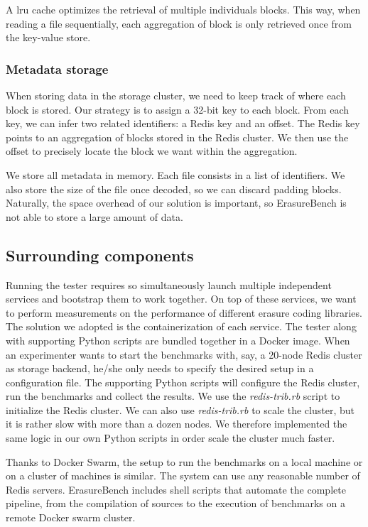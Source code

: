 A \ac{lru} cache optimizes the retrieval of multiple individuals blocks.
This way, when reading a file sequentially, each aggregation of block is only retrieved once from the key-value store.

\subsubsection{Metadata storage}

When storing data in the storage cluster, we need to keep track of where each block is stored. Our strategy is to assign a 32-bit key to each block. From each key, we can infer two related identifiers: a Redis key and an offset. The Redis key points to an aggregation of blocks stored in the Redis cluster. We then use the offset to precisely locate the block we want within the aggregation.

We store all metadata in memory. Each file consists in a list of identifiers. We also store the size of the file once decoded, so we can discard padding blocks. Naturally, the space overhead of our solution is important, so ErasureBench is not able to store a large amount of data.

\subsection{Surrounding components}

Running the tester requires so simultaneously launch multiple independent services and bootstrap them to work together. On top of these services, we want to perform measurements on the performance of different erasure coding libraries. The solution we adopted is the containerization of each service. The tester along with supporting Python scripts are bundled together in a Docker image.
When an experimenter wants to start the benchmarks with, say, a 20-node Redis cluster as storage backend, he/she only needs to specify the desired setup in a configuration file.
The supporting Python scripts will configure the Redis cluster, run the benchmarks and collect the results. We use the \textit{redis-trib.rb} script to initialize the Redis cluster.
We can also use \textit{redis-trib.rb} to scale the cluster, but it is rather slow with more than a dozen nodes. We therefore implemented the same logic in our own Python scripts in order scale the cluster much faster.

Thanks to Docker Swarm, the setup to run the benchmarks on a local machine or on a cluster of machines is similar. The system can use any reasonable number of Redis servers. ErasureBench includes shell scripts that automate the complete pipeline, from the compilation of sources to the execution of benchmarks on a remote Docker swarm cluster.

